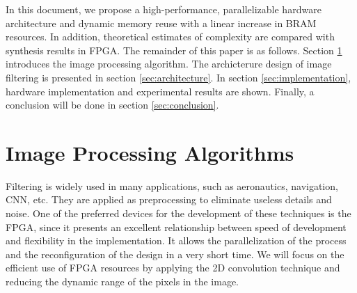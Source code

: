 \documentclass[conference,compsoc]{IEEEtran}
\begin{document}
In this document, we propose a high-performance, parallelizable hardware
architecture and dynamic memory reuse with a linear increase in BRAM resources.
In addition, theoretical estimates of complexity are compared with synthesis
results in FPGA. The remainder of this paper is as follows. Section
\ref{sec:preproc} introduces the image processing algorithm. The archicterure
design of image filtering is presented in section \ref{sec:architecture}. In
section \ref{sec:implementation}, hardware implementation and experimental
results are shown. Finally, a conclusion will be done in section \ref{sec:conclusion}.

%
%
%
%
%
% 

\section{Image Processing Algorithms}\label{sec:preproc}

Filtering is widely used in many applications, such as aeronautics, navigation,
CNN, etc. They are applied as preprocessing to eliminate useless details and
noise. One of the preferred devices for the development of these techniques is
the FPGA, since it presents an excellent relationship between speed of
development and flexibility in the implementation. It allows the parallelization
of the process and the reconfiguration of the design in a very short time. We
will focus on the efficient use of FPGA resources by applying the 2D convolution
technique and reducing the dynamic range of the pixels in the image.
\end{document}
